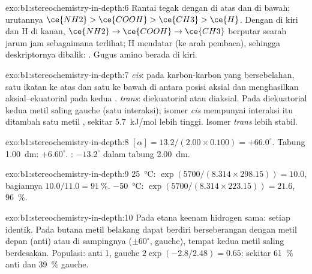 \begin{solution}{exo:b1:stereochemistry-in-depth:6}
Rantai tegak dengan  di atas dan  di bawah; urutannya
$\ce{NH2} > \ce{COOH} > \ce{CH3} > \ce{H}$. Dengan  di kiri dan
H di kanan, $\ce{NH2} \to \ce{COOH} \to \ce{CH3}$ berputar searah jarum
jam sebagaimana terlihat; H mendatar (ke arah pembaca), sehingga
deskriptornya dibalik: . Gugus amino berada di kiri.
\end{solution}

\begin{solution}{exo:b1:stereochemistry-in-depth:7}
\textit{cis}: pada karbon-karbon yang bersebelahan, satu ikatan ke atas
dan satu ke bawah di antara posisi aksial dan  menghasilkan
aksial--ekuatorial pada kedua . \textit{trans}: diekuatorial atau
diaksial. Pada  diekuatorial kedua metil saling gauche (satu
interaksi); isomer \textit{cis} mempunyai interaksi itu ditambah satu
metil , sekitar \qty{5.7}{kJ/mol} lebih tinggi. Isomer
\textit{trans} lebih stabil.
\end{solution}

\begin{solution}{exo:b1:stereochemistry-in-depth:8}
$[\alpha] = 13.2/(2.00 \times 0.100) = +66.0^\circ$. Tabung \qty{1.00}{dm}:
$+6.60^\circ$. : $-13.2^\circ$ dalam tabung \qty{2.00}{dm}.
\end{solution}

\begin{solution}{exo:b1:stereochemistry-in-depth:9}
\qty{25}{\celsius}: $\exp(5700/(8.314 \times 298.15)) = 10.0$, bagiannya
$10.0/11.0 = \qty{91}{\percent}$. \qty{-50}{\celsius}: $\exp(5700/(8.314
\times 223.15)) = 21.6$, \qty{96}{\percent}.
\end{solution}

\begin{solution}{exo:b1:stereochemistry-in-depth:10}
Pada etana keenam hidrogen sama: setiap  identik. Pada
butana metil belakang dapat berdiri berseberangan dengan metil depan
(anti) atau di sampingnya ($\pm 60^\circ$, gauche), tempat kedua metil
saling berdesakan. Populasi: anti 1, gauche $2\exp(-2.8/2.48) = 0.65$:
sekitar \qty{61}{\percent} anti dan \qty{39}{\percent} gauche.
\end{solution}

